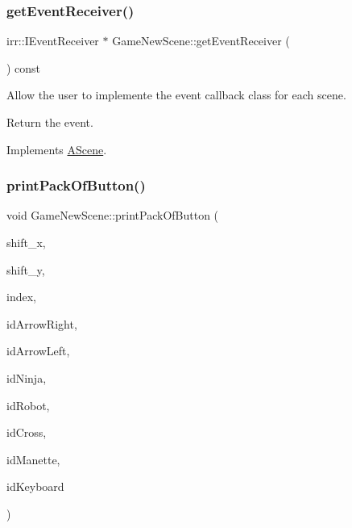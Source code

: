 \subsubsection{\texorpdfstring{get\+Event\+Receiver()}{getEventReceiver()}}
{\footnotesize\ttfamily irr\+::\+I\+Event\+Receiver $\ast$ Game\+New\+Scene\+::get\+Event\+Receiver (\begin{DoxyParamCaption}{ }\end{DoxyParamCaption}) const\hspace{0.3cm}{\ttfamily [virtual]}}



Allow the user to implemente the event callback class for each scene. 

Return the event. 

Implements \hyperlink{classAScene_af521e5e6d30a5d2e5d30eb333e4d3abd}{A\+Scene}.

\mbox{\label{classGameNewScene_a91e4754cf941c9ef80f539eab3f87ada}} 
\subsubsection{\texorpdfstring{print\+Pack\+Of\+Button()}{printPackOfButton()}}
{\footnotesize\ttfamily void Game\+New\+Scene\+::print\+Pack\+Of\+Button (\begin{DoxyParamCaption}\item[{Int}]{shift\+\_\+x,  }\item[{Int}]{shift\+\_\+y,  }\item[{Int}]{index,  }\item[{indie\+::\+G\+U\+I\+Button\+Id}]{id\+Arrow\+Right,  }\item[{indie\+::\+G\+U\+I\+Button\+Id}]{id\+Arrow\+Left,  }\item[{indie\+::\+G\+U\+I\+Button\+Id}]{id\+Ninja,  }\item[{indie\+::\+G\+U\+I\+Button\+Id}]{id\+Robot,  }\item[{indie\+::\+G\+U\+I\+Button\+Id}]{id\+Cross,  }\item[{indie\+::\+G\+U\+I\+Button\+Id}]{id\+Manette,  }\item[{indie\+::\+G\+U\+I\+Button\+Id}]{id\+Keyboard }\end{DoxyParamCaption})}



